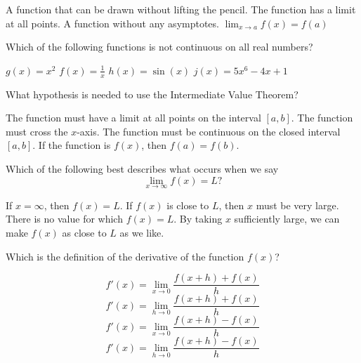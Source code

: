 \documentclass{exam}
\begin{document}
\begin{questions}
\begin{choices}
\choice A function that can be drawn without lifting the pencil.
\choice The function has a limit at all points.
\choice A function without any asymptotes.
\choice $\lim_{x \rightarrow a} f(x) = f(a)$
\end{choices}
\question
Which of the following functions is not continuous on all real numbers?
\begin{choices}
\choice $g(x) = x^2$
\choice $f(x) = \frac{1}{x}$
\choice $h(x) = \sin(x)$
\choice $j(x) = 5x^6 - 4x + 1$
\end{choices}
\question
What hypothesis is needed to use the Intermediate Value Theorem?
\begin{choices}
\choice The function must have a limit at all points on the interval $[a,b]$.
\choice The function must cross the $x$-axis.
\choice The function must be continuous on the closed interval $[a,b]$.
\choice If the function is $f(x)$, then $f(a) = f(b)$.
\end{choices}
\question
Which of the following best describes what occurs when we say $$\lim_{x \rightarrow \infty} f(x) = L?$$
\begin{choices}
\choice If $x = \infty$, then $f(x) = L$.
\choice If $f(x)$ is close to $L$, then $x$ must be very large.
\choice There is no value for which $f(x) = L$.
\choice By taking $x$ sufficiently large, we can make $f(x)$ as close to $L$ as we like.
\end{choices}
\question Which is the definition of the derivative of the function $f(x)$?
\begin{choices}
\choice $$f'(x) = \lim_{x \rightarrow 0} \frac{f(x+h) + f(x)}{h}$$
\choice $$f'(x) = \lim_{h \rightarrow 0} \frac{f(x+h) + f(x)}{h}$$
\choice $$f'(x) = \lim_{x \rightarrow 0} \frac{f(x+h) - f(x)}{h}$$
\choice $$f'(x) = \lim_{h \rightarrow 0} \frac{f(x+h) - f(x)}{h}$$
\end{choices}
\end{questions}
\end{document}
